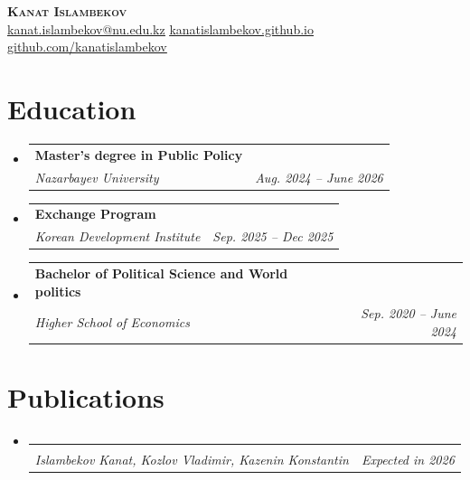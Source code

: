 \documentclass[letterpaper,11pt]{article}
\makeatletter
\newcommand{\resumeItem}[1]{
  \item\small{
    {#1 \vspace{-2pt}}
  }
}
\newcommand{\resumeSubheading}[4]{
  \vspace{-2pt}\item
    \begin{tabular*}{0.97\textwidth}[t]{l@{\extracolsep{\fill}}r}
      \textbf{#1} & #2 \\
      \textit{#3} & \textit{\small #4} \\

    \end{tabular*}\vspace{-7pt}
}
\newcommand{\resumeProjectHeading}[2]{
    \item
    \begin{tabular*}{0.97\textwidth}{l@{\extracolsep{\fill}}r}
      \small#1 & #2 \\
    \end{tabular*}\vspace{-7pt}
}
\newcommand{\resumeSubHeadingListStart}{\begin{itemize}[leftmargin=0.15in, label={}]}
\newcommand{\resumeSubHeadingListEnd}{\end{itemize}}
\newcommand{\resumeItemListStart}{\begin{itemize}}
\newcommand{\resumeItemListEnd}{\end{itemize}\vspace{-5pt}}
\makeatother
\begin{document}

\begin{center}
    \textbf{\Huge \scshape Kanat Islambekov} \\ \vspace{1pt}
    \href{mailto:x@x.com}{\underline{kanat.islambekov@nu.edu.kz}} 
    \href{https://kanatislambekov.github.io}
    {\underline{kanatislambekov.github.io}}
    \href{https://github.com/kanatislambekov}{\underline{github.com/kanatislambekov}}
\end{center}


\section{Education}
  \resumeSubHeadingListStart
    \resumeSubheading
      {Master's degree in Public Policy}{}
      {Nazarbayev University}{Aug. 2024 -- June 2026}
    \resumeSubheading
      {Exchange Program}{}
      {Korean Development Institute}{Sep. 2025 -- Dec 2025}
    \resumeSubheading
      {Bachelor of Political Science and World politics}{}
      {Higher School of Economics}{Sep. 2020 -- June 2024}
  \resumeSubHeadingListEnd

\section{Publications}
\resumeSubHeadingListStart
  \resumeSubheading
    {\begin{minipage}[t]{0.75\linewidth} %
       Working Paper - The role of religiosity and family ties in the context of 
       Second Demographic Transition in Kazakhstan
     \end{minipage}}
    {} %
    {Islambekov Kanat, Kozlov Vladimir, Kazenin Konstantin}
    {\hfill Expected in 2026} %
\resumeSubHeadingListEnd


    
\end{document}
